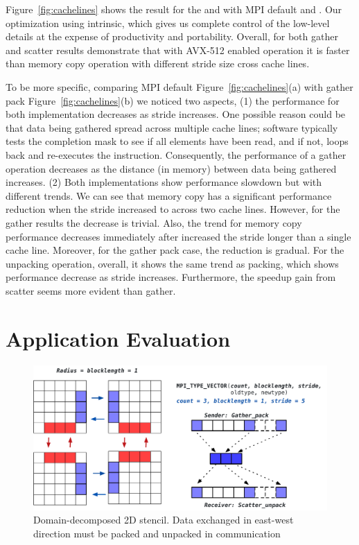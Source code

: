 \documentclass[conference]{IEEEtran}
\begin{document}
Figure~\ref{fig:cachelines} shows the result for the  and  with MPI default and \ourwork.
Our optimization using intrinsic, which gives us complete control of the low-level details at the expense of productivity and portability.
Overall, for both gather and scatter results demonstrate that with AVX-512 enabled operation it is faster than memory copy operation with different stride size cross cache lines.

To be more specific, comparing MPI default Figure~\ref{fig:cachelines}(a) with gather pack Figure~\ref{fig:cachelines}(b) we noticed two aspects, (1) the performance for both implementation decreases as stride increases. One possible reason could be that data being gathered spread across multiple cache lines; software typically tests the completion mask to see if all elements have been read, and if not, loops back and re-executes the instruction. Consequently, the performance of a gather operation decreases as the distance (in memory) between data being gathered increases.
(2) Both implementations show performance slowdown but with different trends.
We can see that memory copy has a significant performance reduction when the stride increased to across two cache lines. However, for the gather results the decrease is trivial.
Also, the trend for memory copy performance decreases immediately after increased the stride longer than a single cache line.
Moreover, for the gather pack case, the reduction is gradual.
For the unpacking operation, overall, it shows the same trend as packing, which shows performance decrease as stride increases. Furthermore, the speedup gain from scatter seems more evident than gather.

\section{Application Evaluation}\label{sec:application}

\begin{figure}[h]
    \centering
    \includegraphics[trim={0 0 0 1.5cm},clip, width=0.9\linewidth]{stencil3.pdf}
    \caption{Domain-decomposed 2D stencil. Data exchanged in east-west direction must be packed and unpacked in communication}
    \label{fig:stencil3}
\end{figure}
\end{document}
